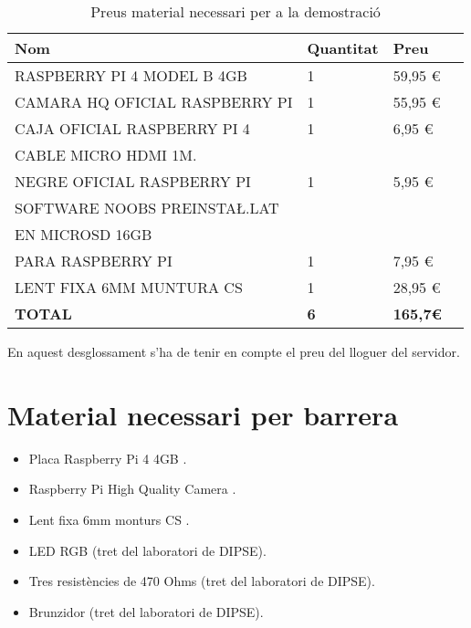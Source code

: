 
\begin{table}[H]
\centering
\begin{tabular}{llll}
\hline
    \textbf{Nom} & \textbf{Quantitat} & \textbf{Preu} \\ \hline
    RASPBERRY PI 4 MODEL B 4GB & 1 & 59,95 € \\ \hline
    CAMARA HQ OFICIAL RASPBERRY PI & 1 & 55,95 € \\ \hline
    CAJA OFICIAL RASPBERRY PI 4 & 1 & 6,95 € \\ \hline
    CABLE MICRO HDMI 1M. \\ NEGRE OFICIAL RASPBERRY PI & 1 & 5,95 € \\ \hline
    SOFTWARE NOOBS PREINSTA\L.LAT \\ EN MICROSD 16GB \\ PARA RASPBERRY PI & 1 & 7,95 € \\ \hline
    LENT FIXA 6MM MUNTURA CS & 1 & 28,95 € \\ \hline
    \textbf{TOTAL} & \textbf{6} & \textbf{165,7€} \\ \hline
\end{tabular}
\caption{Preus material necessari per a la demostració}
\label{tab:my-pressupost}
\end{table}

En aquest desglossament s'ha de tenir en compte el preu del lloguer del servidor.

\section{Material necessari per barrera}

\begin{itemize}
    \item Placa Raspberry Pi 4 4GB \autocite{raspberry_Pi}.
    \item Raspberry Pi High Quality Camera \autocite{camera_rasp}.
    \item Lent fixa 6mm monturs CS \autocite{lent_rpi}.
    \item LED RGB (tret del laboratori de DIPSE).
    \item Tres resistències de 470 Ohms (tret del laboratori de DIPSE).
    \item Brunzidor (tret del laboratori de DIPSE).
\end{itemize}